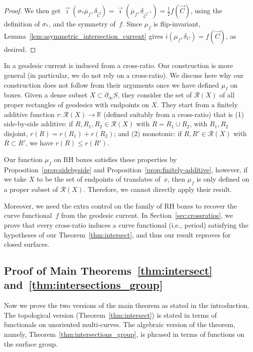 \begin{proof}
We then get $\vec\imath(\sigma_*\overline\mu_f,\delta_{\vec C})
=\vec\imath(\overline\mu_f,\delta_{\vec C^{-1}})=\frac12 f(\vec C)$, using the definition of $\sigma_*$, and the symmetry of~$f$.
Since $\mu_f$ is flip-invariant, Lemma~\ref{lem:asymmetric_intersection_current}
gives
$i(\mu_f,\delta_C)=f(\vec C)$, as desired.
\end{proof}

\begin{remark}
In \cite[Proposition~4.3]{BIPP24:PositiveCrossratios} a geodesic current is induced
from a cross-ratio.
Our construction is more general (in particular, we do not rely on a cross-ratio).
We discuss here why our construction does not follow from their
arguments once we have defined $\mu_f$ on boxes.
Given a dense subset $X \subset \partial_{\infty} S$, they consider the set of $\mathcal{R}(X)$ of all proper rectangles of geodesics with endpoints on $X$.
They start from a finitely additive function $r \colon \mathcal{R}(X) \to \mathbb{R}$ (defined suitably from a cross-ratio)
that is (1) side-by-side additive: if $R,R_1,R_2 \in \mathcal{R}(X)$
with $R=R_1 \cup R_2$, with $R_1,R_2$ disjoint, $r(R)=r(R_1)+r(R_2)$;
and (2) monotonic: if $R,R' \in \mathcal{R}(X)$ with $R \subset R'$, we have $r(R) \leq r(R')$.

Our function $\mu_f$ on RH boxes satisfies these properties by Proposition~\ref{prop:sidebyside}
and Proposition~\ref{prop:finitely-additive}, however, if we take $X$ to
be the set of
endpoints of translates of~$x$, then $\mu_f$ is only
defined on a proper subset of $\mathcal{R}(X)$.
Therefore, we cannot directly apply their result.

Moreover, we need the extra control on the family of RH
boxes to recover the curve functional~$f$ from the geodesic current.
In Section~\ref{sec:crossratios}, we prove that every cross-ratio
induces a curve functional (i.e., period) satisfying the hypotheses of
our Theorem~\ref{thm:intersect}, and thus our result reproves
\cite[Proposition~4.3]{BIPP24:PositiveCrossratios} for closed surfaces.
\end{remark}



\subsection{Proof of Main Theorems~\ref{thm:intersect} and~\texorpdfstring{\ref{thm:intersections_group}}{A'}}

Now we prove the two versions of the main theorem as stated in the introduction. The topological version (Theorem~\ref{thm:intersect}) is stated in terms of functionals on unoriented multi-curves. The algebraic version of the
theorem, namely, Theorem~\ref{thm:intersections_group}, is phrased in terms of functions on the surface group.

